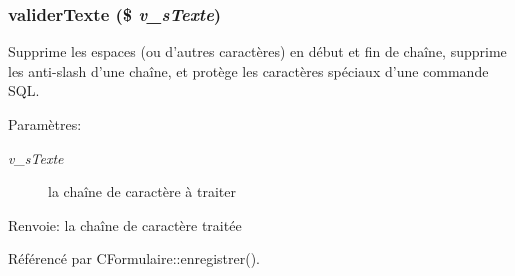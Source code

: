\subsubsection{\setlength{\rightskip}{0pt plus 5cm}validerTexte (\$ {\em v\_\-sTexte})}\label{fonctions__form_8inc_8php_54992d950b6dc3a5d37700481688fdfc}


Supprime les espaces (ou d'autres caractères) en début et fin de chaîne, supprime les anti-slash d'une chaîne, et protège les caractères spéciaux d'une commande SQL. 

\begin{Desc}
\item[Paramètres:]
\begin{description}
\item[{\em v\_\-sTexte}]la chaîne de caractère à traiter\end{description}
\end{Desc}
\begin{Desc}
\item[Renvoie:]la chaîne de caractère traitée \end{Desc}


Référencé par CFormulaire::enregistrer().